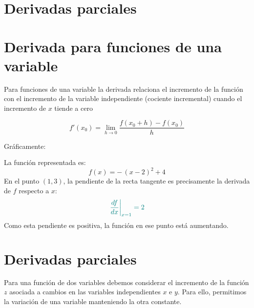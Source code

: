 \documentclass{article}
\begin{document}
\newpage


\section{Derivadas parciales}





\section*{Derivada para funciones de una variable}

Para funciones de una variable la derivada relaciona el incremento de la función con el incremento de la variable independiente (cociente incremental) cuando el incremento de \(x\) tiende a cero

\[
f'(x_{0}) = \lim_{h\to0}\frac{f(x_{0}+h)-f(x_{0})}{h}
\]

Gráficamente:
\begin{center}
\end{center}
La función representada es:
\[
f(x) = -\,(x-2)^{2} + 4
\]
En el punto \((1,3)\), la pendiente de la recta tangente es precisamente la derivada de \(f\) respecto a \(x\):
\[
\color{teal}
\left.\frac{df}{dx}\right|_{x=1} = 2
\]
Como esta pendiente es positiva, la función en ese punto está aumentando.




\section*{Derivadas parciales}

Para una función de dos variables debemos considerar el incremento de la función \(z\) asociada a cambios en las variables independientes \(x\) e \(y\). Para ello, permitimos la variación de una variable manteniendo la otra constante.
\end{document}
